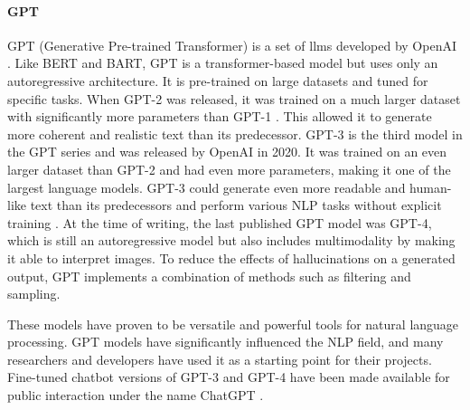     \paragraph{GPT\\}
    GPT (Generative Pre-trained Transformer) is a set of \glspl{llm} developed by OpenAI \cite{radfordImprovingLanguageUnderstanding2018}. Like BERT and BART, GPT is a transformer-based model but uses only an autoregressive architecture. It is pre-trained on large datasets and tuned for specific tasks. When GPT-2 was released, it was trained on a much larger dataset with significantly more parameters than GPT-1 \cite{radfordLanguageModelsAre2019}. This allowed it to generate more coherent and realistic text than its predecessor. GPT-3 is the third model in the GPT series and was released by OpenAI in 2020. It was trained on an even larger dataset than GPT-2 and had even more parameters, making it one of the largest language models. GPT-3 could generate even more readable and human-like text than its predecessors and perform various NLP tasks without explicit training \cite{brownLanguageModelsAre2020}. At the time of writing, the last published GPT model was GPT-4, which is still an autoregressive model but also includes multimodality \cite{openaiGPT4TechnicalReport2023} by making it able to interpret images. To reduce the effects of hallucinations on a generated output, GPT implements a combination of methods such as filtering and sampling.
    
    These models have proven to be versatile and powerful tools for natural language processing. GPT models have significantly influenced the NLP field, and many researchers and developers have used it as a starting point for their projects. Fine-tuned chatbot versions of GPT-3 and GPT-4 have been made available for public interaction under the name ChatGPT \cite{ChatGPT}.

    
    
    
    
